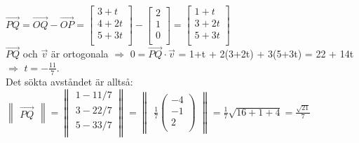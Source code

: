 \documentclass{article}
\begin{document}
$\vec{PQ} = \vec{OQ}-\vec{OP} = 
\begin{bmatrix}
    3 + t \\
    4 + 2t \\
    5 + 3t \\
\end{bmatrix}
-
\begin{bmatrix}
    2 \\
    1 \\
    0 \\
\end{bmatrix}
=
\begin{bmatrix}
    1 + t \\
    3 + 2t \\
    5 + 3t \\
\end{bmatrix}
$
\\
$\vec{PQ}$ och $\vec{v}$ är ortogonala $\Rightarrow$ 
$0 = \vec{PQ} \cdot \vec{v}$ = 1+t + 2(3+2t) + 3(5+3t) = 22 + 14t $\Rightarrow$ 
$t = -\frac{11}{7}$.\\
Det sökta avståndet är alltså:
$
\begin{Vmatrix}
    \vec{PQ}
\end{Vmatrix}
=
\begin{Vmatrix}
    1 - 11/7 \\
    3 - 22/7 \\
    5 - 33/7 \\
\end{Vmatrix}
=
\begin{Vmatrix}
    \frac{1}{7}
        \begin{pmatrix}
            -4 \\
            -1 \\
             2 \\
        \end{pmatrix}
\end{Vmatrix}
=
\frac{1}{7} \sqrt{16+1+4} = \frac{\sqrt{21}}{7}
$
\end{document}

